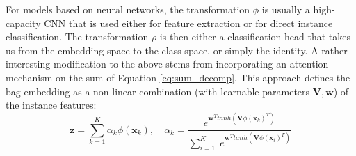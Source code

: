 \documentclass[journal,twoside,web]{ieeecolor}
\DeclareMathOperator*{\mean}{mean}
\begin{document}

For models based on neural networks,  the transformation $\phi$ is usually a
high-capacity CNN that is used either for feature extraction or for direct
instance classification. The transformation $\rho$ is then either a
classification head that takes us  from the embedding space to the class space,
or simply  the identity.
%
A rather interesting modification to the above stems from incorporating an attention
mechanism on the sum of Equation \ref{eq:sum_decomp}.
This approach \cite{pmlr-v80-ilse18a} defines the bag embedding as  a non-linear
combination (with learnable parameters $\mathbf{V}, \mathbf{w}$)  of the instance features:
\begin{equation}
\mathbf{z} = \sum_{k=1}^K \alpha_k \phi(\mathbf{x}_k),%
\quad \alpha_k = \frac{e^{\mathbf{w}^T tanh(\mathbf{V}\phi(\mathbf{x}_k)^T)}}{\sum_{i=1}^K
\; e^{\mathbf{w}^T tanh(\mathbf{V}\phi(\mathbf{x}_i)^T)}}\label{eq:attention_mil}
\end{equation}
\end{document}
